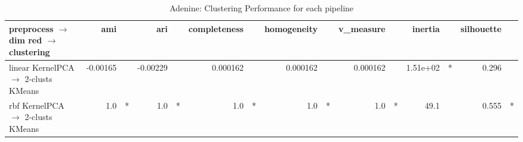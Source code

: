\documentclass{article}
\begin{document}
\begin{table}[h!]
\centering
\caption{Adenine: Clustering Performance for each pipeline}
\label{clust-perf}
\begin{adjustbox}{max width=\textwidth}
\begin{tabular}{l|rc|rc|rc|rc|rc|rc|rc}
\textbf{preprocess $\to$ dim red $\to$ clustering} & \textbf{ami} && \textbf{ari} && \textbf{completeness} && \textbf{homogeneity} && \textbf{v\_measure} && \textbf{inertia} && \textbf{silhouette} & \\ \hline
linear KernelPCA $\to$ 2-clusts KMeans & -0.00165&   & -0.00229&   &  0.000162&   &  0.000162&   &  0.000162&   &  1.51e+02& * &  0.296&   \\
rbf KernelPCA $\to$ 2-clusts KMeans &  1.0& * &  1.0& * &  1.0& * &  1.0& * &  1.0& * &  49.1&   &  0.555& * \\
\hline
\end{tabular}
\end{adjustbox}
\end{table}
\end{document}
